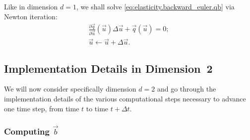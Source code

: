 Like in dimension $d = 1$, we shall solve \eqref{eq:elasticity.backward_euler.qb} via Newton iteration:
\begin{gather*}
\frac{\partial\vec{q}}{\partial\vec{u}} \left( \vec{u} \right) \Delta \vec{u} + \vec{q} \left( \vec{u} \right) = 0; \\
\vec{u} \leftarrow \vec{u} + \Delta \vec{u}.
\end{gather*}

\subsection{Implementation Details in Dimension~2}

We will now consider specifically dimension $d = 2$ and go through the implementation details of the various computational steps necessary to advance one time step, from time $t$ to time $t + \Delta t$.

\vspace{.5\baselineskip}
\subsubsection{Computing $\vec{b}$}

